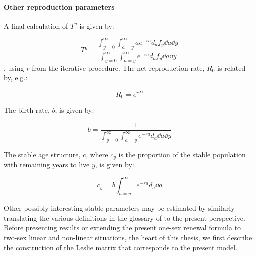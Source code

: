 \paragraph{Other reproduction parameters}
A final calculation of $T^y$ is given by:

\begin{equation}
 T^y =  \frac{\int _{y=0}^\infty \int _{a=y}^\infty a e^{-ra} d_a f_y \dd a
\dd y}{\int _{y=0}^\infty \int _{a=y}^\infty e^{-ra} d_a f_y \dd a \dd y}
\end{equation}
, using $r$ from the iterative procedure. The net reproduction rate, $R_0$ is
related by, e.g.:

\begin{equation}
R_0 = e^{r T^y}
\end{equation}

The birth rate, $b$, is given by:

\begin{equation}
b = \frac{1}{\int _{y=0}^\infty \int _{a=y}^\infty e^{-ra} d_a \dd a
\dd y}
\end{equation}

The stable age structure, $c$, where $c_y$ is the
proportion of the stable population with remaining years to live $y$, is given
by:

\begin{equation}
c_y = b \int _{a=y}^\infty e^{-ra} d_a \dd a
\end{equation}

Other possibly interesting stable parameters may be estimated by
similarly translating the various definitions in the glossary of
\citet{coale1972growth} to the present perspective. Before presenting 
results or extending the present one-sex renewal
formula to two-sex linear and non-linear situations, the heart of this 
thesis, we first describe the construction of the Leslie matrix that corresponds to the
present model.
